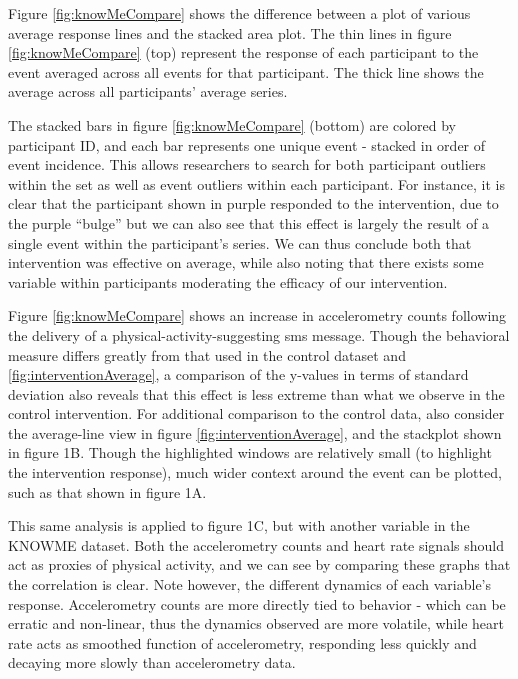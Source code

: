 Figure \ref{fig:knowMeCompare} shows the difference between a plot of various average response lines and the stacked area plot.
The thin lines in figure \ref{fig:knowMeCompare} (top) represent the response of each participant to the event averaged across all events for that participant.
The thick line shows the average across all participants' average series.

The stacked bars in figure \ref{fig:knowMeCompare} (bottom) are colored by participant ID, and each bar represents one unique event - stacked in order of event incidence.
This allows researchers to search for both participant outliers within the set as well as event outliers within each participant.
For instance, it is clear that the participant shown in purple responded to the intervention, due to the purple ``bulge'' but we can also see that this effect is largely the result of a single event within the participant's series.
We can thus conclude both that intervention was effective on average, while also noting that there exists some variable within participants moderating the efficacy of our intervention.


Figure \ref{fig:knowMeCompare} shows an increase in accelerometry counts following the delivery of a physical-activity-suggesting sms message.
Though the behavioral measure differs greatly from that used in the control dataset and \ref{fig:interventionAverage}, a comparison of the y-values in terms of standard deviation also reveals that this effect is less extreme than what we observe in the control intervention.
For additional comparison to the control data, also consider the average-line view in figure \ref{fig:interventionAverage}, and the stackplot shown in figure 1B.
Though the highlighted windows are relatively small (to highlight the intervention response), much wider context around the event can be plotted, such as that shown in figure 1A.

This same analysis is applied to figure 1C, but with another variable in the KNOWME dataset.
Both the accelerometry counts and heart rate signals should act as proxies of physical activity, and we can see by comparing these graphs that the correlation is clear.
Note however, the different dynamics of each variable's response.
Accelerometry counts are more directly tied to behavior - which can be erratic and non-linear, thus the dynamics observed are more volatile, while heart rate acts as smoothed function of accelerometry, responding less quickly and decaying more slowly than accelerometry data.

